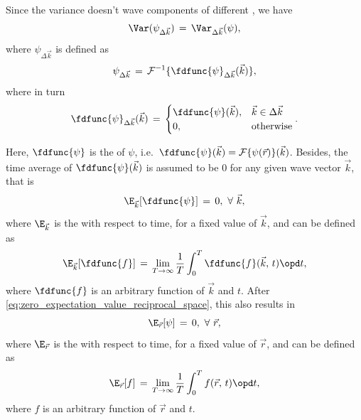 Since the variance doesn't \correlate wave components of different \wavelengths, we have
%
\begin{equation} \label{eq:variance_k_eta_to_variance_eta_k}
\Var(\psi_{\Delta\vec{k}}) \,=\, \Var_{\Delta\vec{k}}(\psi),
\end{equation}
%
where $\psi_{\Delta\vec{k}}$ is defined as
%
\begin{equation} \label{eq:eta_k_of_fd_eta_k}
\psi_{\Delta\vec{k}} \,=\, \mathcal{F}^{-1}\{\fdfunc{\psi}_{\Delta\vec{k}}(\vec{k})\},
\end{equation}
%
where in turn
%
\begin{equation} \label{eq:fd_eta_delta_k_definition}
\fdfunc{\psi}_{\Delta\vec{k}}(\vec{k}) \,=\, \begin{cases}
\fdfunc{\psi}(\vec{k}), & \vec{k} \in \Delta\vec{k} \\
0, & \text{otherwise}
\end{cases}.
\end{equation}

Here, $\fdfunc{\psi}$ is the  of $\psi$, i.e.\ $\fdfunc{\psi}(\vec{k}) = \mathcal{F}\{\psi(\vec{r})\}(\vec{k})$. Besides, the time average of $\fdfunc{\psi}(\vec{k})$ is assumed to be 0 for any given wave vector $\vec{k}$, that is
%
\begin{equation} \label{eq:zero_expectation_value_reciprocal_space}
\E_{\vec{k}}[\fdfunc{\psi}] \,=\, 0,\ \forall\ \vec{k},
\end{equation}
%
where $\E_{\vec{k}}$ is the  with respect to time, for a fixed value of $\vec{k}$, and can be defined as
%
\begin{equation} \label{eq:expectation_value_reciprocal_space_with_regard_to_t_definition}
\E_{\vec{k}}[\fdfunc{f}] \,=\, \lim_{T\to\infty}\frac{1}{T}\int_0^T \fdfunc{f}(\vec{k},\,t)\opd t,
\end{equation}
%
where $\fdfunc{f}$ is an arbitrary function of $\vec{k}$ and $t$. After  \eqref{eq:zero_expectation_value_reciprocal_space}, this also results in 
%
\begin{equation} \label{eq:zero_expectation_value_real_space_with_regard_to_t}
\E_{\vec{r}}[\psi] \,=\, 0,\ \forall\ \vec{r},
\end{equation}
%
where $\E_{\vec{r}}$ is the  with respect to time, for a fixed value of $\vec{r}$, and can be defined as
%
\begin{equation} \label{eq:expectation_value_real_space_with_regard_to_t_definition}
\E_{\vec{r}}[f] \,=\, \lim_{T\to\infty}\frac{1}{T}\int_0^T f(\vec{r},\,t)\opd t,
\end{equation}
%
where $f$ is an arbitrary function of $\vec{r}$ and $t$.

